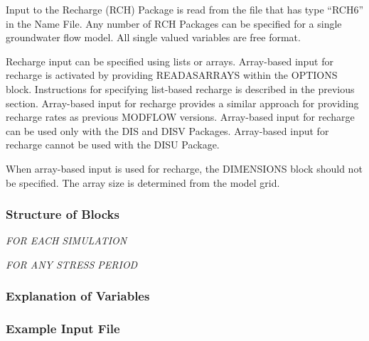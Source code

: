 
Input to the Recharge (RCH) Package is read from the file that has type ``RCH6'' in the Name File.  Any number of RCH Packages can be specified for a single groundwater flow model.  All single valued variables are free format. 

Recharge input can be specified using lists or arrays.  Array-based input for recharge is activated by providing READASARRAYS within the OPTIONS block.   Instructions for specifying list-based recharge is described in the previous section.  Array-based input for recharge provides a similar approach for providing recharge rates as previous MODFLOW versions.  Array-based input for recharge can be used only with the DIS and DISV Packages.  Array-based input for recharge cannot be used with the DISU Package.

When array-based input is used for recharge, the DIMENSIONS block should not be specified.  The array size is determined from the model grid. 

\vspace{5mm}
\subsubsection{Structure of Blocks}
\vspace{5mm}

\noindent \textit{FOR EACH SIMULATION}

\vspace{5mm}
\noindent \textit{FOR ANY STRESS PERIOD}


\vspace{5mm}
\subsubsection{Explanation of Variables}
\begin{description}

\end{description}

\vspace{5mm}
\subsubsection{Example Input File}


